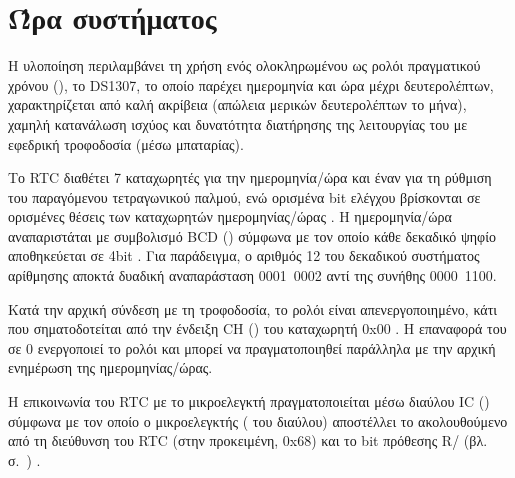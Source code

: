 %




\section{Ώρα συστήματος}

Η υλοποίηση περιλαμβάνει τη χρήση ενός ολοκληρωμένου ως ρολόι πραγματικού χρόνου
(), το DS1307, το οποίο παρέχει ημερομηνία και ώρα
μέχρι δευτερολέπτων, χαρακτηρίζεται από καλή ακρίβεια (απώλεια μερικών
δευτερολέπτων το μήνα), χαμηλή κατανάλωση ισχύος και δυνατότητα διατήρησης της
λειτουργίας του με εφεδρική τροφοδοσία (μέσω μπαταρίας).

Το RTC διαθέτει 7 καταχωρητές για την ημερομηνία\slash{}ώρα και έναν για τη
ρύθμιση του παραγόμενου τετραγωνικού παλμού, ενώ ορισμένα bit ελέγχου βρίσκονται
σε ορισμένες θέσεις των καταχωρητών ημερομηνίας\slash{}ώρας
\parencite[8]{ds1307}. Η ημερομηνία\slash{}ώρα
αναπαριστάται με συμβολισμό BCD () σύμφωνα με
τον οποίο κάθε δεκαδικό ψηφίο αποθηκεύεται σε 4bit \parencite[8]{ds1307}.
Για παράδειγμα, ο αριθμός 12 του δεκαδικού συστήματος αρίθμησης αποκτά δυαδική
αναπαράσταση 0001~0002 αντί της συνήθης 0000~1100.


Κατά την αρχική σύνδεση με τη τροφοδοσία, το ρολόι είναι απενεργοποιημένο, κάτι
που σηματοδοτείται από την ένδειξη CH () του καταχωρητή 0x00
\parencite[8]{ds1307}. Η επαναφορά του σε 0 ενεργοποιεί το ρολόι και μπορεί να
πραγματοποιηθεί παράλληλα με την αρχική ενημέρωση της ημερομηνίας\slash{}ώρας.

Η επικοινωνία του RTC με το μικροελεγκτή πραγματοποιείται μέσω διαύλου
IC () σύμφωνα με τον οποίο ο μικροελεγκτής
( του διαύλου) αποστέλλει το  ακολουθούμενο από τη
διεύθυνση του RTC (στην προκειμένη, 0x68) και το bit πρόθεσης R\slash{}
(βλ.  σ.~\pageref{subsec:i2c}) \parencite[1,10]{ds1307}.

